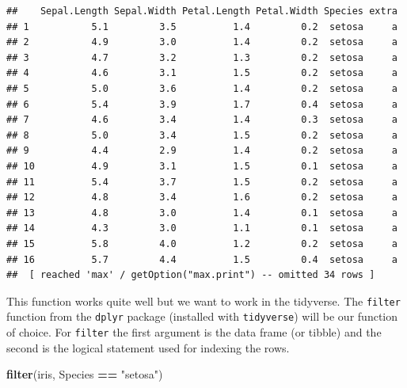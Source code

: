 \documentclass[
]{book}
\newenvironment{Shaded}{\begin{snugshade}}{\end{snugshade}}
\newcommand{\KeywordTok}[1]{\textcolor[rgb]{0.13,0.29,0.53}{\textbf{#1}}}
\newcommand{\NormalTok}[1]{#1}
\newcommand{\OperatorTok}[1]{\textcolor[rgb]{0.81,0.36,0.00}{\textbf{#1}}}
\newcommand{\StringTok}[1]{\textcolor[rgb]{0.31,0.60,0.02}{#1}}
\theoremstyle{definition}
\theoremstyle{definition}
\theoremstyle{definition}
\theoremstyle{remark}
\begin{document}
\begin{verbatim}
##    Sepal.Length Sepal.Width Petal.Length Petal.Width Species extra
## 1           5.1         3.5          1.4         0.2  setosa     a
## 2           4.9         3.0          1.4         0.2  setosa     a
## 3           4.7         3.2          1.3         0.2  setosa     a
## 4           4.6         3.1          1.5         0.2  setosa     a
## 5           5.0         3.6          1.4         0.2  setosa     a
## 6           5.4         3.9          1.7         0.4  setosa     a
## 7           4.6         3.4          1.4         0.3  setosa     a
## 8           5.0         3.4          1.5         0.2  setosa     a
## 9           4.4         2.9          1.4         0.2  setosa     a
## 10          4.9         3.1          1.5         0.1  setosa     a
## 11          5.4         3.7          1.5         0.2  setosa     a
## 12          4.8         3.4          1.6         0.2  setosa     a
## 13          4.8         3.0          1.4         0.1  setosa     a
## 14          4.3         3.0          1.1         0.1  setosa     a
## 15          5.8         4.0          1.2         0.2  setosa     a
## 16          5.7         4.4          1.5         0.4  setosa     a
##  [ reached 'max' / getOption("max.print") -- omitted 34 rows ]
\end{verbatim}

This function works quite well but we want to work in the tidyverse. The \texttt{filter} function from the \texttt{dplyr} package (installed with \texttt{tidyverse}) will be our function of choice. For \texttt{filter} the first argument is the data frame (or tibble) and the second is the logical statement used for indexing the rows.

\begin{Shaded}
\begin{Highlighting}[]
\KeywordTok{filter}\NormalTok{(iris, Species }\OperatorTok{==}\StringTok{ "setosa"}\NormalTok{)}
\end{Highlighting}
\end{Shaded}
\end{document}
